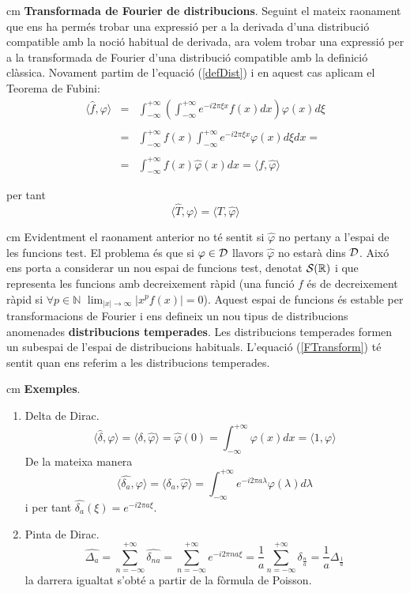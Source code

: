 \documentclass{article}
\def\N{\mathbb N}
\def\R{\mathbb R}
\begin{document}
 cm
\noindent
\textbf{Transformada de Fourier de distribucions}.
Seguint el mateix raonament que ens ha perm\'es trobar una expressi\'o 
per a la derivada d'una distribuci\'o compatible amb la noci\'o habitual
de derivada, ara volem trobar una expressi\'o per a la transformada de 
Fourier d'una distribuci\'o compatible amb la definici\'o 
cl\`assica. Novament partim de l'equaci\'o (\ref{defDist}) 
i en aquest cas aplicam el 
Teorema de Fubini:
\[
\begin{array}{lcl}
\langle \hat{f} , \varphi \rangle & = &
\int_{-\infty}^{+\infty} (\int_{-\infty}^{+\infty} e^{- i 2 \pi \xi x} 
f(x) dx ) \varphi(x) d\xi \\
\\
 & = & \int_{-\infty}^{+\infty} f(x) 
\int_{-\infty}^{+\infty} e^{- i 2 \pi \xi x} \varphi(x) d\xi dx= \\
\\
 & = & \int_{-\infty}^{+\infty} f(x) \hat{\varphi}(x) dx = 
\langle f, \hat{\varphi} \rangle
\end{array}
\]

\noindent
per tant
\begin{equation}
\label{FTransform}
\langle \hat{T}, \varphi \rangle = \langle T, \hat{\varphi} \rangle
\end{equation}

 cm
Evidentment el raonament anterior no t\'e sentit si $\hat{\varphi}$ no pertany a
l'espai de les funcions test. El problema \'es que si $\varphi \in {\cal D}$
llavors $\hat{\varphi}$ no estar\`a dins ${\cal D}$. Aix\'o ens porta a
considerar un nou espai de funcions test, denotat ${\cal S}(\R)$ i que
representa les funcions amb decreixement r\`apid
(una funci\'o $f$ \'es de decreixement r\`apid si $\forall p \in \N$ 
$\lim_{|x| \rightarrow \infty} |x^p f(x) | = 0$). 
Aquest espai de funcions
\'es estable per transformacions de Fourier i
ens defineix un nou tipus de distribucions anomenades {\bf distribucions
temperades}. Les distribucions temperades formen un subespai de l'espai
de distribucions habituals. L'equaci\'o (\ref{FTransform}) t\'e sentit
quan ens referim a les distribucions temperades.

 cm
\noindent
\textbf{Exemples}.
\begin{enumerate}[Exemple 1.]
\item Delta de Dirac. 
\[
\langle \hat{\delta}, \varphi \rangle = \langle \delta, \hat{\varphi} \rangle =
\hat{\varphi}(0)=\int_{-\infty}^{+\infty} \varphi(x) dx = 
\langle 1, \varphi \rangle
\]
\noindent
De la mateixa manera
\[
\langle \hat{\delta_a}, \varphi \rangle = 
\langle \delta_a, \hat{\varphi} \rangle =
\int_{-\infty}^{+\infty} e^{- i 2 \pi a \lambda} \varphi(\lambda) d\lambda
\]
\noindent
i per tant $\hat{\delta_a}(\xi)=e^{- i 2 \pi a \xi}$.
\item Pinta de Dirac.
\[
\widehat{\Delta_a}=\sum_{n=-\infty}^{+\infty} \widehat{\delta_{na}} =
\sum_{n=-\infty}^{+\infty} e^{-i 2 \pi n a \xi} = 
\frac{1}{a} \sum_{n=-\infty}^{+\infty} \delta_{\frac{n}{a}} =
\frac{1}{a} \Delta_{\frac{1}{a}}
\]
\noindent
la darrera igualtat s'obt\'e a partir de la f\`ormula de Poisson.
\end{enumerate}
\end{document}
